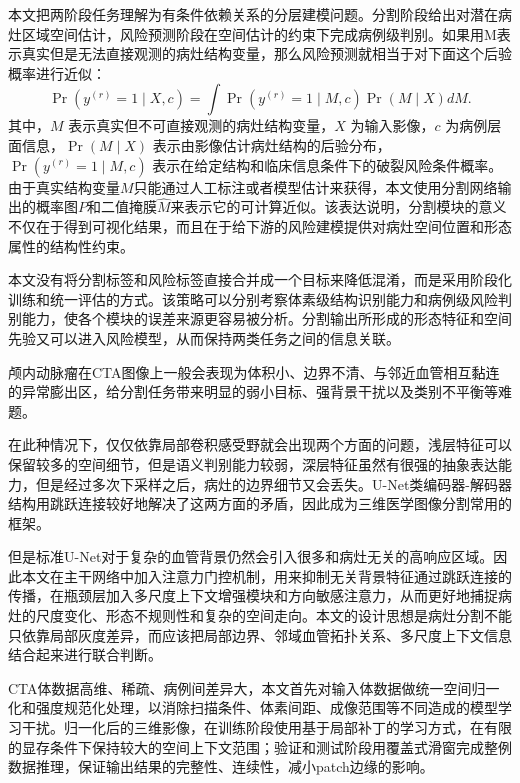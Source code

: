 本文把两阶段任务理解为有条件依赖关系的分层建模问题。分割阶段给出对潜在病灶区域空间估计，风险预测阶段在空间估计的约束下完成病例级判别。如果用M表示真实但是无法直接观测的病灶结构变量，那么风险预测就相当于对下面这个后验概率进行近似：
\begin{equation}
\Pr(y^{(r)}=1\mid X,c)=\int \Pr(y^{(r)}=1\mid M,c)\Pr(M\mid X)dM.
\end{equation}
其中，$M$ 表示真实但不可直接观测的病灶结构变量，$X$ 为输入影像，$c$ 为病例层面信息，$\Pr(M\mid X)$ 表示由影像估计病灶结构的后验分布，$\Pr(y^{(r)}=1\mid M,c)$ 表示在给定结构和临床信息条件下的破裂风险条件概率。由于真实结构变量$M$只能通过人工标注或者模型估计来获得，本文使用分割网络输出的概率图$P$和二值掩膜$\hat{M}$来表示它的可计算近似。该表达说明，分割模块的意义不仅在于得到可视化结果，而且在于给下游的风险建模提供对病灶空间位置和形态属性的结构性约束。

本文没有将分割标签和风险标签直接合并成一个目标来降低混淆，而是采用阶段化训练和统一评估的方式。该策略可以分别考察体素级结构识别能力和病例级风险判别能力，使各个模块的误差来源更容易被分析。分割输出所形成的形态特征和空间先验又可以进入风险模型，从而保持两类任务之间的信息关联。


颅内动脉瘤在CTA图像上一般会表现为体积小、边界不清、与邻近血管相互黏连的异常膨出区，给分割任务带来明显的弱小目标、强背景干扰以及类别不平衡等难题。

在此种情况下，仅仅依靠局部卷积感受野就会出现两个方面的问题，浅层特征可以保留较多的空间细节，但是语义判别能力较弱，深层特征虽然有很强的抽象表达能力，但是经过多次下采样之后，病灶的边界细节又会丢失。U-Net类编码器-解码器结构用跳跃连接较好地解决了这两方面的矛盾，因此成为三维医学图像分割常用的框架。

但是标准U-Net对于复杂的血管背景仍然会引入很多和病灶无关的高响应区域。因此本文在主干网络中加入注意力门控机制，用来抑制无关背景特征通过跳跃连接的传播，在瓶颈层加入多尺度上下文增强模块和方向敏感注意力，从而更好地捕捉病灶的尺度变化、形态不规则性和复杂的空间走向。本文的设计思想是病灶分割不能只依靠局部灰度差异，而应该把局部边界、邻域血管拓扑关系、多尺度上下文信息结合起来进行联合判断。


CTA体数据高维、稀疏、病例间差异大，本文首先对输入体数据做统一空间归一化和强度规范化处理，以消除扫描条件、体素间距、成像范围等不同造成的模型学习干扰。归一化后的三维影像，在训练阶段使用基于局部补丁的学习方式，在有限的显存条件下保持较大的空间上下文范围；验证和测试阶段用覆盖式滑窗完成整例数据推理，保证输出结果的完整性、连续性，减小patch边缘的影响。

